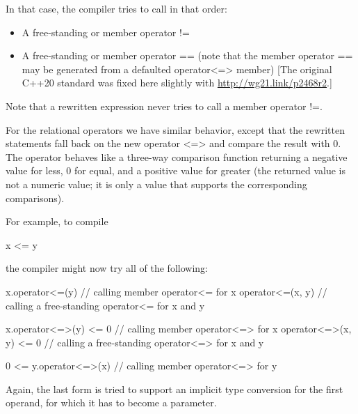 In that case, the compiler tries to call in that order:

\begin{itemize}
\item
A free-standing or member operator !=

\item
A free-standing or member operator == (note that the member operator == may be generated from a defaulted operator<=> member) [The original C++20 standard was fixed here slightly with \url{http://wg21.link/p2468r2}.]
\end{itemize}

Note that a rewritten expression never tries to call a member operator !=.


For the relational operators we have similar behavior, except that the rewritten statements fall back on the new operator <=> and compare the result with 0. The operator behaves like a three-way comparison function returning a negative value for less, 0 for equal, and a positive value for greater (the returned value is not a numeric value; it is only a value that supports the corresponding comparisons).

For example, to compile

\begin{cpp}
x <= y
\end{cpp}

the compiler might now try all of the following:

\begin{cpp}
x.operator<=(y) // calling member operator<= for x
operator<=(x, y) // calling a free-standing operator<= for x and y

x.operator<=>(y) <= 0 // calling member operator<=> for x
operator<=>(x, y) <= 0 // calling a free-standing operator<=> for x and y

0 <= y.operator<=>(x) // calling member operator<=> for y
\end{cpp}

Again, the last form is tried to support an implicit type conversion for the first operand, for which it has to become a parameter.







